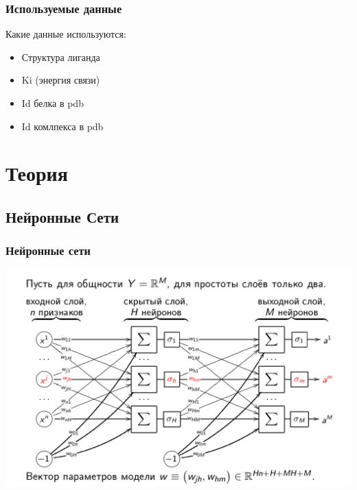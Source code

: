 \documentclass{beamer}
\begin{document}
\begin{frame}
\frametitle{Используемые данные}
Какие данные используются:
\begin{itemize}
\pause
\item Структура лиганда\pause
\item Ki (энергия связи)\pause
\item Id белка в pdb\pause
\item Id комлпекса в pdb\pause
\end{itemize}
\end{frame}

\section{Теория} %
\subsection{Нейронные Сети}
\begin{frame}
\frametitle{Нейронные сети}\begin{center}
\includegraphics[scale=0.3]{neurel_network.png}
\end{center}
\end{frame}
\end{document}
